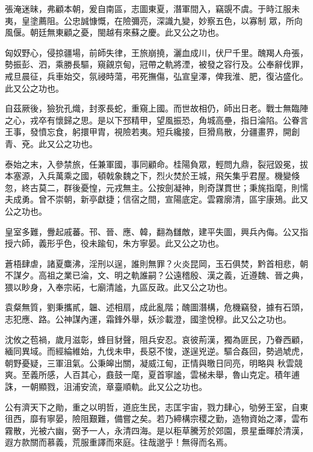 \begin{pinyinscope}
 張淹迷昧，弗顧本朝，爰自南區，志圖東夏，潛軍間入，竊覬不虞。于時江服未夷，皇塗薦阻。公忠誠慷慨，在險彌亮，深識九變，妙察五色，以寡制
 眾，所向風偃。朝廷無東顧之憂，閩越有來蘇之慶。此又公之功也。



 匈奴野心，侵掠疆場，前師失律，王旅崩撓，灑血成川，伏尸千里。醜羯人舟張，勢振彭、泗，乘勝長驅，窺覦京甸，冠帶之軌將湮，被發之容行及。公奉辭伐罪，戒旦晨征，兵車始交，氛祲時蕩，弔死撫傷，弘宣皇澤，俾我淮、肥，復沾盛化。此又公之功也。



 自茲厥後，獫狁孔熾，封豕長蛇，重窺上國。而世故相仍，師出日老。戰士無臨陣之心，戎卒有懷歸之思。是以下邳精甲，望風振恐，角城高壘，指日淪陷。公眷言王事，發憤忘食，躬擐甲胄，視險若夷。短兵纔接，巨猾鳥散，分疆畫界，開創青、兗。此又公之功也。



 泰始之末，入參禁旅，任兼軍國，事同顧命。桂陽負眾，輕問九鼎，裂冠毀冕，拔本塞源，入兵萬乘之國，頓戟象魏之下，烈火焚於王城，飛矢集乎君屋。機變倏忽，終古莫二，群後憂惶，元戎無主。公按劍凝神，則奇謀貫世；秉旄指麾，則懦
 夫成勇。曾不崇朝，新亭獻捷；信宿之間，宣陽底定。雲霧廓清，區宇康鳷。此又公之功也。



 皇室多難，釁起戚蕃。邗、晉、應、韓，翻為讎敵，建平失圖，興兵內侮。公又指授六師，義形乎色，役未踰旬，朱方寧晏。此又公之功也。



 蒼梧肆虐，諸夏麋沸，淫刑以逞，誰則無罪？火炎昆岡，玉石俱焚，黔首相悲，朝不謀夕。高祖之業已淪，文、明之軌誰嗣？公遠稽殷、漢之義，近遵魏、晉之典，猥以眇身，入奉宗祏，七廟清謐，九區反政。此又公之功也。



 袁粲無質，劉秉攜貳，韞、述相扇，成此亂階；醜圖潛構，危機竊發，據有石頭，志犯應、路。公神謀內運，霜鋒外舉，妖沴載澄，國塗悅穆。此又公之功也。



 沈攸之苞禍，歲月滋彰，蜂目豺聲，阻兵安忍。哀彼荊漢，獨為匪民，乃眷西顧，緬同異域。而經綸維始，九伐未申，長惡不悛，遂逞兇逆。驅合姦回，勢過虓虎，朝野憂疑，三軍沮氣。公秉皞出關，凝威江甸，正情與曒日同亮，明略與
 秋雲競爽。至義所感，人百其心，鼖鼓一麾，夏首寧謐，雲梯未舉，魯山克定。積年逋誅，一朝顯戮，沮浦安流，章臺順軌。此又公之功也。



 公有濟天下之勛，重之以明哲，道庇生民，志匡宇宙，戮力肆心，劬勞王室，自東徂西，靡有寧晏，險阻艱難，備嘗之矣。若乃締構宗稷之勤，造物資始之澤，雲布霧散，光被六幽，弼予一人，永清四海。是以秬草騰芳於郊園，景星垂暉於清漢，遐方款關而慕義，荒服重譯而來庭。往哉邈乎！無得而名焉。




\end{pinyinscope}
